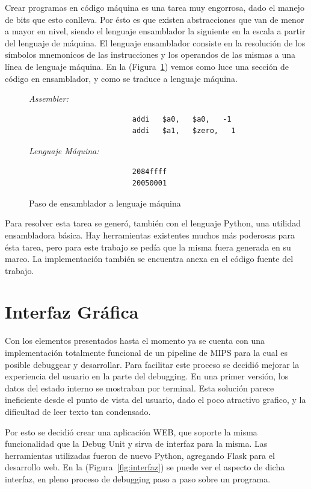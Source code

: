 \documentclass[12pt]{article}
\begin{document}
Crear programas en código máquina es una tarea muy engorrosa, dado el manejo de bits que esto conlleva. Por ésto es que existen abstracciones que van de menor a mayor en nivel, siendo el lenguaje ensamblador la siguiente en la escala a partir del lenguaje de máquina. El lenguaje ensamblador consiste en la resolución de los símbolos mnemonicos de las instrucciones y los operandos de las mismas a una línea de lenguaje máquina. En la (Figura~\ref{fig:asm}) vemos como luce una sección de código en ensamblador, y como se traduce a lenguaje máquina.
\\
\begin{figure}[ht]
\centering

\textit{Assembler:}
\begin{lstlisting}
                        addi   $a0,   $a0,   -1
                        addi   $a1,   $zero,   1
\end{lstlisting}
\textit{Lenguaje Máquina:}
\begin{lstlisting}
                        2084ffff
                        20050001
\end{lstlisting}
\caption{Paso de ensamblador a lenguaje máquina}
\label{fig:asm}
\end{figure}

Para resolver esta tarea se generó, también con el lenguaje Python, una utilidad ensambladora básica. Hay herramientas existentes muchos más poderosas para ésta tarea, pero para este trabajo se pedía que la misma fuera generada en su marco. La implementación también se encuentra anexa en el código fuente del trabajo.

\section{Interfaz Gráfica}
Con los elementos presentados hasta el momento ya se cuenta con una implementación totalmente funcional de un pipeline de MIPS para la cual es posible debuggear y desarrollar. Para facilitar este proceso se decidió mejorar la experiencia del usuario en la parte del debugging. En una primer versión, los datos del estado interno se mostraban por terminal. Esta solución parece ineficiente desde el punto de vista del usuario, dado el poco atractivo grafico, y la dificultad de leer texto tan condensado.

Por esto se decidió crear una aplicación WEB, que soporte la misma funcionalidad que la Debug Unit y sirva de interfaz para la misma. Las herramientas utilizadas fueron de nuevo Python, agregando Flask para el desarrollo web. En la (Figura~\ref{fig:interfaz}) se puede ver el aspecto de dicha interfaz, en pleno proceso de debugging paso a paso sobre un programa.
\end{document}
